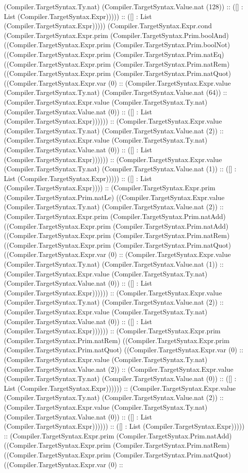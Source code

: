 \documentclass[11pt]{article}
\begin{document}
(Compiler.TargetSyntax.Ty.nat) (Compiler.TargetSyntax.Value.nat (128)) :: ([] : List (Compiler.TargetSyntax.Expr))))) :: ([] : List (Compiler.TargetSyntax.Expr))))) (Compiler.TargetSyntax.Expr.cond (Compiler.TargetSyntax.Expr.prim (Compiler.TargetSyntax.Prim.boolAnd) ((Compiler.TargetSyntax.Expr.prim (Compiler.TargetSyntax.Prim.boolNot) ((Compiler.TargetSyntax.Expr.prim (Compiler.TargetSyntax.Prim.natEq) ((Compiler.TargetSyntax.Expr.prim (Compiler.TargetSyntax.Prim.natRem) ((Compiler.TargetSyntax.Expr.prim (Compiler.TargetSyntax.Prim.natQuot) ((Compiler.TargetSyntax.Expr.var (0) :: (Compiler.TargetSyntax.Expr.value (Compiler.TargetSyntax.Ty.nat) (Compiler.TargetSyntax.Value.nat (64)) :: (Compiler.TargetSyntax.Expr.value (Compiler.TargetSyntax.Ty.nat) (Compiler.TargetSyntax.Value.nat (0)) :: ([] : List (Compiler.TargetSyntax.Expr)))))) :: (Compiler.TargetSyntax.Expr.value (Compiler.TargetSyntax.Ty.nat) (Compiler.TargetSyntax.Value.nat (2)) :: (Compiler.TargetSyntax.Expr.value (Compiler.TargetSyntax.Ty.nat) (Compiler.TargetSyntax.Value.nat (0)) :: ([] : List (Compiler.TargetSyntax.Expr)))))) :: (Compiler.TargetSyntax.Expr.value (Compiler.TargetSyntax.Ty.nat) (Compiler.TargetSyntax.Value.nat (1)) :: ([] : List (Compiler.TargetSyntax.Expr))))) :: ([] : List (Compiler.TargetSyntax.Expr)))) :: (Compiler.TargetSyntax.Expr.prim (Compiler.TargetSyntax.Prim.natLe) ((Compiler.TargetSyntax.Expr.value (Compiler.TargetSyntax.Ty.nat) (Compiler.TargetSyntax.Value.nat (2)) :: (Compiler.TargetSyntax.Expr.prim (Compiler.TargetSyntax.Prim.natAdd) ((Compiler.TargetSyntax.Expr.prim (Compiler.TargetSyntax.Prim.natAdd) ((Compiler.TargetSyntax.Expr.prim (Compiler.TargetSyntax.Prim.natRem) ((Compiler.TargetSyntax.Expr.prim (Compiler.TargetSyntax.Prim.natQuot) ((Compiler.TargetSyntax.Expr.var (0) :: (Compiler.TargetSyntax.Expr.value (Compiler.TargetSyntax.Ty.nat) (Compiler.TargetSyntax.Value.nat (1)) :: (Compiler.TargetSyntax.Expr.value (Compiler.TargetSyntax.Ty.nat) (Compiler.TargetSyntax.Value.nat (0)) :: ([] : List (Compiler.TargetSyntax.Expr)))))) :: (Compiler.TargetSyntax.Expr.value (Compiler.TargetSyntax.Ty.nat) (Compiler.TargetSyntax.Value.nat (2)) :: (Compiler.TargetSyntax.Expr.value (Compiler.TargetSyntax.Ty.nat) (Compiler.TargetSyntax.Value.nat (0)) :: ([] : List (Compiler.TargetSyntax.Expr)))))) :: (Compiler.TargetSyntax.Expr.prim (Compiler.TargetSyntax.Prim.natRem) ((Compiler.TargetSyntax.Expr.prim (Compiler.TargetSyntax.Prim.natQuot) ((Compiler.TargetSyntax.Expr.var (0) :: (Compiler.TargetSyntax.Expr.value (Compiler.TargetSyntax.Ty.nat) (Compiler.TargetSyntax.Value.nat (2)) :: (Compiler.TargetSyntax.Expr.value (Compiler.TargetSyntax.Ty.nat) (Compiler.TargetSyntax.Value.nat (0)) :: ([] : List (Compiler.TargetSyntax.Expr)))))) :: (Compiler.TargetSyntax.Expr.value (Compiler.TargetSyntax.Ty.nat) (Compiler.TargetSyntax.Value.nat (2)) :: (Compiler.TargetSyntax.Expr.value (Compiler.TargetSyntax.Ty.nat) (Compiler.TargetSyntax.Value.nat (0)) :: ([] : List (Compiler.TargetSyntax.Expr)))))) :: ([] : List (Compiler.TargetSyntax.Expr))))) :: (Compiler.TargetSyntax.Expr.prim (Compiler.TargetSyntax.Prim.natAdd) ((Compiler.TargetSyntax.Expr.prim (Compiler.TargetSyntax.Prim.natRem) ((Compiler.TargetSyntax.Expr.prim (Compiler.TargetSyntax.Prim.natQuot) ((Compiler.TargetSyntax.Expr.var (0) :: 
\end{document}

